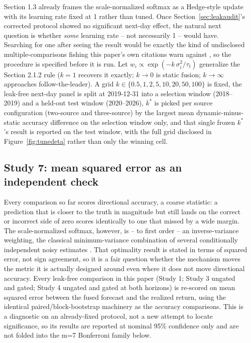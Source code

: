 \documentclass[10pt,a4paper,twocolumn]{article}
\begin{document}
Section 1.3 already frames the scale-normalized softmax as a Hedge-style update with its learning rate fixed at 1 rather than tuned. Once Section~\ref{sec:leakaudit}'s corrected protocol showed no significant next-day effect, the natural next question is whether \emph{some} learning rate -- not necessarily 1 -- would have. Searching for one after seeing the result would be exactly the kind of undisclosed multiple-comparisons fishing this paper's own citations warn against \cite{bailey2014,harvey2016}, so the procedure is specified before it is run. Let $w_i \propto \exp(-k\,\sigma_i^2/\tau_t)$ generalize the Section 2.1.2 rule ($k=1$ recovers it exactly; $k\to0$ is static fusion; $k\to\infty$ approaches follow-the-leader). A grid $k\in\{0.5,1,2,5,10,20,50,100\}$ is fixed, the leak-free next-day panel is split at 2019-12-31 into a selection window (2018--2019) and a held-out test window (2020--2026), $k^\ast$ is picked per source configuration (two-source and three-source) by the largest mean dynamic-minus-static accuracy difference on the selection window only, and that single frozen $k^\ast$'s result is reported on the test window, with the full grid disclosed in Figure~\ref{fig:tunedeta} rather than only the winning cell.

\subsection{Study 7: mean squared error as an independent check}
\label{sec:mse}

Every comparison so far scores directional accuracy, a coarse statistic: a prediction that is closer to the truth in magnitude but still lands on the correct or incorrect side of zero scores identically to one that missed by a wide margin. The scale-normalized softmax, however, is -- to first order -- an inverse-variance weighting, the classical minimum-variance combination of several conditionally independent noisy estimates \cite{hoeting1999}. That optimality result is stated in terms of squared error, not sign agreement, so it is a fair question whether the mechanism moves the metric it is actually designed around even where it does not move directional accuracy. Every leak-free comparison in this paper (Study 1; Study 3 ungated and gated; Study 4 ungated and gated at both horizons) is re-scored on mean squared error between the fused forecast and the realized return, using the identical paired/block-bootstrap machinery as the accuracy comparisons. This is a diagnostic on an already-fixed protocol, not a new attempt to locate significance, so its results are reported at nominal 95\% confidence only and are not folded into the m=7 Bonferroni family below.
\end{document}
